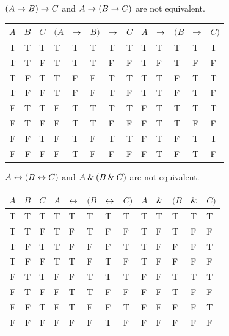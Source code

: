 \begin{earg}
\item $(A \rightarrow B) \rightarrow C$ and $A \rightarrow (B \rightarrow C)$ are not equivalent.
\begin{flushleft}
\begin{tabular}{d d d | f e e e h | f e e e e}
$A$ & $B$ & $C$ & $(A$ & $\rightarrow$ & $B)$ & $\rightarrow$ & $C$ & $A$ & $\rightarrow$ & $(B$ & $\rightarrow$ & $C)$\\
\hline
T & T & T &      T & T & T &   T & T &      T & T &   T & T & T\Tstrut\\
T & T & F &      T & T & T &   F & F &      T & F &   T & F & F\\
T & F & T &      T & F & F &   T & T &      T & T &   F & T & T\\
T & F & F &      T & F & F &   T & F &      T & T &   F & T & F\\\hline
F & T & T &      F & T & T &   T & T &      F & T &   T & T & T\Tstrut\\
F & T & F &      F & T & T &   F & F &      F & T &   T & F & F\\
F & F & T &      F & T & F &   T & T &      F & T &   F & T & T\\
F & F & F &      F & T & F &   F & F &      F & T &   F & T & F 
\end{tabular}
\end{flushleft}\medskip

\item $A \leftrightarrow (B \leftrightarrow C)$ and $A \mathbin{\&} (B \mathbin{\&} C)$ are not equivalent.
\begin{flushleft}
\begin{tabular}{d d d | f e e e h | f e e e e}
$A$ & $B$ & $C$ & $A$ & $\leftrightarrow$ & $(B$ & $\leftrightarrow$ & $C)$ & $A$ & $\mathbin{\&}$ & $(B$ & $\mathbin{\&}$ & $C)$\\
\hline
T & T & T &    T & T &    T & T &  T &       T & T &   T & T & T\Tstrut\\
T & T & F &    T & F &    T & F &  F &        T & F &   T & F & F\\
T & F & T &    T & F &    F & F &  T &        T & F &   F & F & T\\
T & F & F &    T & T &    F & T &  F &        T & F &   F & F & F\\\hline
F & T & T &    F & F &    T & T &  T &        F & F &   T & T & T\Tstrut\\
F & T & F &    F & T &    T & F &  F &        F & F &   T & F & F\\
F & F & T &    F & T &    F & F &  T &        F & F &   F & F & T\\
F & F & F &    F & F &    F & T &  F &        F & F &   F & F & F
\end{tabular}
\end{flushleft}\medskip

\end{earg}


